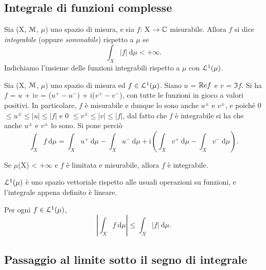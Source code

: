 \documentclass[Completo.tex]{subfiles}
\begin{document}
\subsection{Integrale di funzioni complesse}
\begin{Def}
	Sia (X, $\eu[M]$, $\mu$) uno spazio di misura, e sia $f$: X $\ra \bb[C]$ misurabile. Allora $f$ si dice \textit{integrabile} (oppure \textit{sommabile}) rispetto a $\mu$ se
	\begin{equation*}
	\int_X \vert f \vert \ \mathrm{d}\mu < +\infty.
	\end{equation*}
	Indichiamo l'insieme delle funzioni integrabili rispetto a $\mu$ con $\eu[L]^1(\mu)$.
\end{Def}
\begin{Def}
	Sia (X, $\eu[M]$, $\mu$) uno spazio di misura ed $f \in \eu[L]^1(\mu)$. Siano $u$ = $\bb[R]e f$ e $v$ = $\Im f$. Si ha $f$ = $u$ + i$v$ = ($u^{+} - u^{-}$) + i($v^{+} - v^{-}$), con tutte le funzioni in gioco a valori positivi. In particolare, $f$ è misurabile e dunque lo sono anche $u^{\pm}$ e $v^{\pm}$, e poiché 0 $\leq u^{\pm} \leq \vert u \vert \leq \vert f \vert$ e 0 $\leq v^{\pm} \leq \vert v \vert \leq \vert f \vert$, dal fatto che $f$ è integrabile si ha che anche $u^{\pm}$ e $v^{\pm}$ lo sono. Si pone perciò
	\begin{equation*}
	\int_X f \ \mathrm{d}\mu = \int_X u^{+} \ \mathrm{d}\mu - \int_X u^{-} \ \mathrm{d}\mu + \mathrm{i} \left( \int_X v^{+} \ \mathrm{d}\mu - \int_X v^{-} \ \mathrm{d}\mu \right).
	\end{equation*}
\end{Def}
\begin{Ex}
	Se $\mu$(X) < $+\infty$ e $f$ è limitata e misurabile, allora $f$ è integrabile.
\end{Ex}
\begin{Prop}
	$\eu[L]^1(\mu)$ è uno spazio vettoriale rispetto alle usuali operazioni su funzioni, e l'integrale appena definito è lineare.
\end{Prop}
\begin{Prop}
	Per ogni $f \in \eu[L]^1(\mu)$,
	\begin{equation*}
	\left\vert \int_X f \ \mathrm{d}\mu \right\vert \leq \int_X \vert f \vert \ \mathrm{d}\mu.
	\end{equation*}
\end{Prop}
\subsection{Passaggio al limite sotto il segno di integrale}
\end{document}
